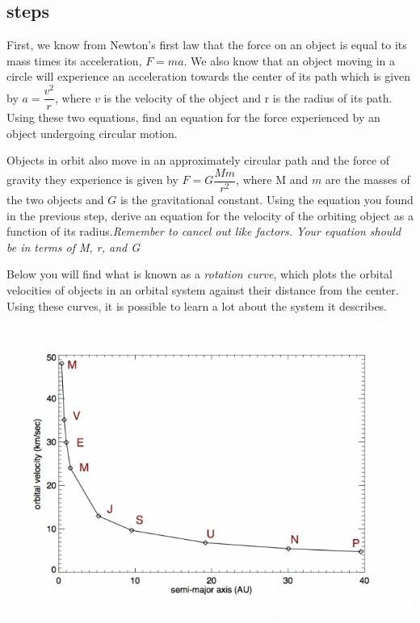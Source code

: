 \subsection{steps}

\begin{steps}
	\item First, we know from Newton's first law that the force on an object is equal to its mass times its acceleration, $F=ma$. We also know that an object moving in a circle will experience an acceleration towards the center of its path which is given by $a = \dfrac{v^2}{r}$, where $v$ is the velocity of the object and r is the radius of its path. Using these two equations, find an equation for the force experienced by an object undergoing circular motion. 
	
	\item Objects in orbit also move in an approximately circular path and the force of gravity they experience is given by $F = G\dfrac{Mm}{r^2}$, where M and $m$ are the masses of the two objects and $G$ is the gravitational constant. Using the equation you found in the previous step, derive an equation for the velocity of the orbiting object as a function of its radius.\textit{Remember to cancel out like factors. Your equation should be in terms of M, r, and G}
\end{steps}

Below you will find what is known as a \textit{rotation curve}, which plots the orbital velocities of objects in an orbital system against their distance from the center. Using these curves, it is possible to learn a lot about the system it describes. 

\includegraphics[scale = .7]{srt-background-rotation/keplerian-orbit.jpg}

